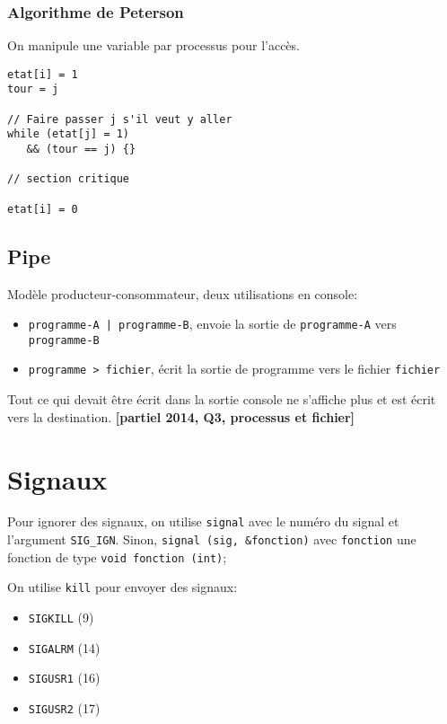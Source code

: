 \documentclass[a4paper]{article}
\begin{document}
\begin{multicols*}{2}
    \subsubsection{Algorithme de Peterson}

    On manipule une variable par processus pour l'accès.
    \begin{lstlisting}[frame=shadowbox]
etat[i] = 1
tour = j

// Faire passer j s'il veut y aller
while (etat[j] = 1) 
   && (tour == j) {} 

// section critique

etat[i] = 0
    \end{lstlisting}

    \subsection{Pipe}

    Modèle producteur-consommateur, deux utilisations en console:
    \begin{itemize}
        \item \texttt{programme-A | programme-B}, envoie la sortie de \texttt{programme-A} vers \texttt{programme-B}
        \item \texttt{programme > fichier}, écrit la sortie de programme vers le fichier \texttt{fichier}
    \end{itemize}

    Tout ce qui devait être écrit dans la sortie console ne s'affiche plus et est écrit vers la destination. \textbf{[partiel 2014, Q3, processus et fichier]}



    \section{Signaux}

    Pour ignorer des signaux, on utilise \texttt{signal} avec le numéro du signal et l'argument \texttt{SIG\_IGN}. Sinon, \texttt{signal (sig, \&fonction)} avec \texttt{fonction} une fonction de type \texttt{void fonction (int)};

    On utilise \texttt{kill} pour envoyer des signaux:
    \begin{itemize}
        \item \texttt{SIGKILL} (9)
        \item \texttt{SIGALRM} (14)
        \item \texttt{SIGUSR1} (16)
        \item \texttt{SIGUSR2} (17)
    \end{itemize}


\end{multicols*}
\end{document}
